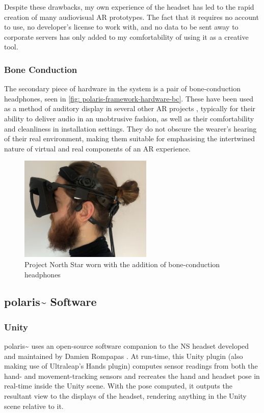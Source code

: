 Despite these drawbacks, my own experience of the headset has led to the rapid creation of many audiovisual AR prototypes. The fact that it requires no account to use, no developer’s license to work with, and no data to be sent away to corporate servers has only added to my comfortability of using it as a creative tool.

\subsubsection{Bone Conduction}\label{sec: polaris-framework-hardware-bc}
The secondary piece of hardware in the system is a pair of bone-conduction headphones, seen in \autoref{fig: polaris-framework-hardware-bc}. These have been used as a method of auditory display in several other AR projects \citep{lindeman2008,barde2016,chevalier2018}, typically for their ability to deliver audio in an unobtrusive fashion, as well as their comfortability and cleanliness in installation settings. They do not obscure the wearer’s hearing of their real environment, making them suitable for emphasising the intertwined nature of virtual and real components of an AR experience.
\begin{figure}
    \centering
    \includegraphics[height=5cm]{figures/06-polaris/polaris-framework-hardware-bc.jpg}
    \caption{Project North Star worn with the addition of bone-conduction headphones}
    \label{fig: polaris-framework-hardware-bc}
\end{figure}

\subsection{polaris\textasciitilde{} Software}\label{sec: polaris-framework-software}
\subsubsection{Unity}\label{sec: polaris-framework-software-unity}
polaris\textasciitilde{} uses an open-source software companion to the NS headset developed and maintained by Damien Rompapas \citeyearpar{rompapas2020}. At run-time, this Unity plugin (also making use of Ultraleap’s Hands plugin) computes sensor readings from both the hand- and movement-tracking sensors and recreates the hand and headset pose in real-time inside the Unity scene. With the pose computed, it outputs the resultant view to the displays of the headset, rendering anything in the Unity scene relative to it.

